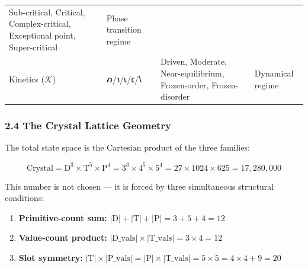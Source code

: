 \documentclass[12pt,a4paper]{article}
\begin{document}
\begin{longtable}[]{@{}llll@{}}
\begin{minipage}[t]{0.22\columnwidth}
Sub-critical, Critical, Complex-critical, Exceptional point,
Super-critical\strut
\end{minipage} & \begin{minipage}[t]{0.17\columnwidth}\raggedright
Phase transition regime\strut
\end{minipage}\tabularnewline
\begin{minipage}[t]{0.30\columnwidth}\raggedright
Kinetics (\(\mathcal{K}\))\strut
\end{minipage} & \begin{minipage}[t]{0.19\columnwidth}\raggedright
𐑺/𐑪/𐑧/𐑤/𐑘\strut
\end{minipage} & \begin{minipage}[t]{0.22\columnwidth}\raggedright
Driven, Moderate, Near-equilibrium, Frozen-order, Frozen-disorder\strut
\end{minipage} & \begin{minipage}[t]{0.17\columnwidth}\raggedright
Dynamical regime\strut
\end{minipage}\tabularnewline
\bottomrule
\end{longtable}

\hypertarget{the-crystal-lattice-geometry}{%
\subsubsection{2.4 The Crystal Lattice
Geometry}\label{the-crystal-lattice-geometry}}

The total state space is the Cartesian product of the three families:

\[\text{Crystal} = \text{D}^{3} \times \text{T}^{5} \times \text{P}^{4} = 3^3 \times 4^5 \times 5^4 = 27 \times 1024 \times 625 = 17,280,000\]

This number is not chosen --- it is forced by three simultaneous
structural conditions:

\begin{enumerate}
\def\labelenumi{\arabic{enumi}.}
\tightlist
\item
  \textbf{Primitive-count sum:}
  \(|\text{D}| + |\text{T}| + |\text{P}| = 3 + 5 + 4 = 12\)
\item
  \textbf{Value-count product:}
  \(|\text{D\_vals}| \times |\text{T\_vals}| = 3 \times 4 = 12\)
\item
  \textbf{Slot symmetry:}
  \(|\text{T}| \times |\text{P\_vals}| = |\text{P}| \times |\text{T\_vals}| = 5 \times 5 = 4 \times 4 + 9 = 20\)
\end{enumerate}
\end{document}
